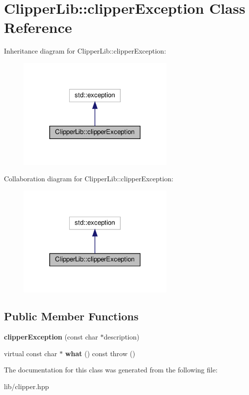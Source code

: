 \hypertarget{class_clipper_lib_1_1clipper_exception}{}\section{Clipper\+Lib\+:\+:clipper\+Exception Class Reference}
\label{class_clipper_lib_1_1clipper_exception}


Inheritance diagram for Clipper\+Lib\+:\+:clipper\+Exception\+:
\nopagebreak
\begin{figure}[H]
\begin{center}
\leavevmode
\includegraphics[width=218pt]{class_clipper_lib_1_1clipper_exception__inherit__graph}
\end{center}
\end{figure}


Collaboration diagram for Clipper\+Lib\+:\+:clipper\+Exception\+:
\nopagebreak
\begin{figure}[H]
\begin{center}
\leavevmode
\includegraphics[width=218pt]{class_clipper_lib_1_1clipper_exception__coll__graph}
\end{center}
\end{figure}
\subsection*{Public Member Functions}
\begin{DoxyCompactItemize}
\item 
\mbox{\label{class_clipper_lib_1_1clipper_exception_a7d44b32d06cd870500355667f6e0d6ed}} 
{\bfseries clipper\+Exception} (const char $\ast$description)
\item 
\mbox{\label{class_clipper_lib_1_1clipper_exception_a32b7ac5a3176d9040ef0a863fd54657a}} 
virtual const char $\ast$ {\bfseries what} () const  throw ()
\end{DoxyCompactItemize}


The documentation for this class was generated from the following file\+:\begin{DoxyCompactItemize}
\item 
lib/clipper.\+hpp\end{DoxyCompactItemize}
